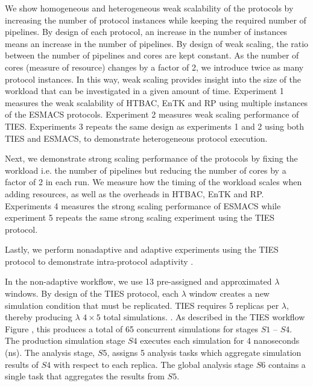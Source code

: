     We show homogeneous and heterogeneous weak scalability of the protocols by
increasing the number of protocol instances while keeping the required number
of pipelines. By design of each protocol, an increase in the number of
instances means an increase in the number of pipelines.  By design of weak 
scaling, the ratio between the number of pipelines and cores are kept constant. 
As the number of cores (measure of resource) changes by a factor of 2, we 
introduce twice as many protocol instances. In this way, weak scaling provides 
insight into the size of the workload that can be investigated in a given amount 
of time.
    Experiment 1 measures the weak scalability of HTBAC, EnTK and RP using 
multiple instances of the ESMACS protocols. Experiment 2 measures weak scaling 
performance of TIES. Experiments 3 repeats the same design as experiments 1 and 
2 using both TIES and ESMACS, to demonstrate heterogeneous protocol execution. 

    Next, we demonstrate strong scaling performance of the protocols by fixing 
the workload i.e. the number of pipelines but reducing the number of cores 
by a factor of 2 in each run. We measure how the timing of the workload scales 
when adding resources,  as well as the overheads in HTBAC, EnTK and RP. Experiments 4 
measures the strong scaling performance of ESMACS while experiment 5 repeats the 
same strong scaling experiment using the TIES protocol. 

    Lastly, we perform nonadaptive and adaptive experiments using the TIES 
protocol to demonstrate intra-protocol adaptivity . 

In the non-adaptive workflow, we use 13 pre-assigned and approximated $\lambda$ 
windows.  By design of the TIES protocol, each $\lambda$ 
window creates a new simulation condition that must be replicated. TIES requires 
5 replicas per $\lambda$, thereby producing $\lambda$ $4\times 5$
total simulations. . As described in the TIES workflow 
Figure , this produces a total of 65 
concurrent simulations for stages $S1$ -- $S4$. The production simulation stage 
$S4$ executes each simulation for 4 nanoseconds (ns). The analysis stage, $S5$, 
assigns 5 analysis tasks which aggregate simulation results of $S4$ with 
respect to each replica. The global analysis stage $S6$ contains a single task
that aggregates the results from $S5$.  

